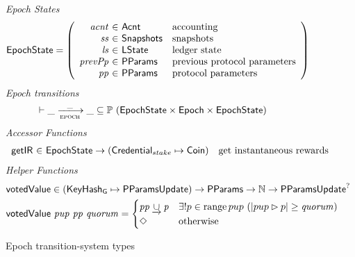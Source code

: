 \begin{figure}[htb]
  \emph{Epoch States}
  \begin{equation*}
    \EpochState =
    \left(
      \begin{array}{r@{~\in~}ll}
        \var{acnt} & \Acnt & \text{accounting}\\
        \var{ss} & \Snapshots & \text{snapshots}\\
        \var{ls} & \LState & \text{ledger state}\\
        \var{prevPp} & \PParams & \text{previous protocol parameters}\\
        \var{pp} & \PParams & \text{protocol parameters}\\
      \end{array}
    \right)
  \end{equation*}
  \emph{Epoch transitions}
  \begin{equation*}
    \vdash
    \var{\_} \trans{epoch}{\_} \var{\_}
    \subseteq \powerset (\EpochState \times \Epoch \times \EpochState)
  \end{equation*}
  \emph{Accessor Functions}
  \begin{equation*}
    \begin{array}{r@{~\in~}lr}
      \fun{getIR} & \EpochState \to (\StakeCredential \mapsto \Coin)
                  & \text{get instantaneous rewards} \\
    \end{array}
  \end{equation*}
  \emph{Helper Functions}
  \begin{align*}
      & \mathsf{votedValue} \in (\mathsf{KeyHash_G}\mapsto\mathsf{PParamsUpdate}) \to \mathsf{PParams} \to \mathbb{N} \to \mathsf{PParamsUpdate}^?\\
      & \mathsf{votedValue}~\mathit{pup}~\mathit{pp}~\mathit{quorum} =
      \begin{cases}
        \mathit{pp}\mathbin{\underrightarrow\cup}\mathit{p}
          & \exists! p\in\operatorname{range}{pup}~(|pup\rhd p|\geq \mathit{quorum}) \\
        \Diamond & \text{otherwise} \\
      \end{cases}
  \end{align*}
  \caption{Epoch transition-system types}
  \label{fig:ts-types:epoch}
\end{figure}


